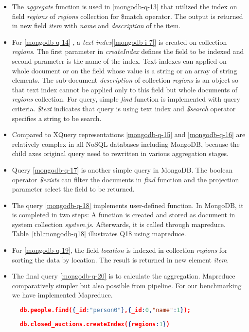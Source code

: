 \begin{itemize}
\item The \textit{aggregate} function is used in \ref{mongodb-q-13} that  utilized the index on field \textit{regions} of \textit{regions} collection for \$match operator. The output is returned in new field \textit{item} with  \textit{name} and \textit{description} of the item.

\item For \ref{mongodb-q-14} , a \textit{text index}[\ref{mongodb-i-7}] is created on collection \textit{regions}. The first parameter in \textit{createIndex} defines the field to be indexed and second parameter is the name of the index. Text indexes can applied on whole document or on the field whose value is a string or an array of string elements. The sub-document \textit{description} of collection \textit{regions} is an object so that text index cannot be applied only to this field but whole documents of \textit{regions} collection.  For query, simple \textit{find} function is implemented with query criteria. \textit{\$text} indicates that query is using text index and \textit{\$search} operator specifies a string to be search. 

\item Compared to XQuery representations \ref{mongodb-q-15} and \ref{mongodb-q-16} are relatively complex in all NoSQL databases including MongoDB, because the child axes original query need to rewritten in various aggregation stages.
\item Query \ref{mongodb-q-17} is another simple query in MongoDB. The boolean operator \textit{\$exists} can filter the documents in \textit{find} function and the projection parameter select the field to be returned. 

\item The query \ref{mongodb-q-18} implements user-defined function. In MongoDB, it is completed in two steps: A function is created and stored as document in system collection \textit{system.js}. Afterwards, it is called through mapreduce. Table~\ref{tbl:mongodb-q18} illustrates Q18 using mapreduce.
\item For \ref{mongodb-q-19}, the field  \textit{location} is indexed in collection \textit{regions} for sorting the data by location. The result is returned in new element \textit{item}.
\item
The final query \ref{mongodb-q-20} is to calculate the aggregation. Mapreduce comparatively simpler but also possible from pipeline. For our benchmarking we have implemented Mapreduce. 
\end{itemize}
\begin{figure}
\centering
\begin{lstlisting}[language=JSON, caption=XMark Query Q1 in MongoDB, label=mongo-xmark-q1]
		db.people.find({_id:"person0"},{_id:0,"name":1});
\end{lstlisting}
\centering
\begin{lstlisting}[language=JSON, caption=MongoDB secondary Index, label=mongodb-create-index]
          db.closed_auctions.createIndex({regions:1})
\end{lstlisting}
\end{figure}


